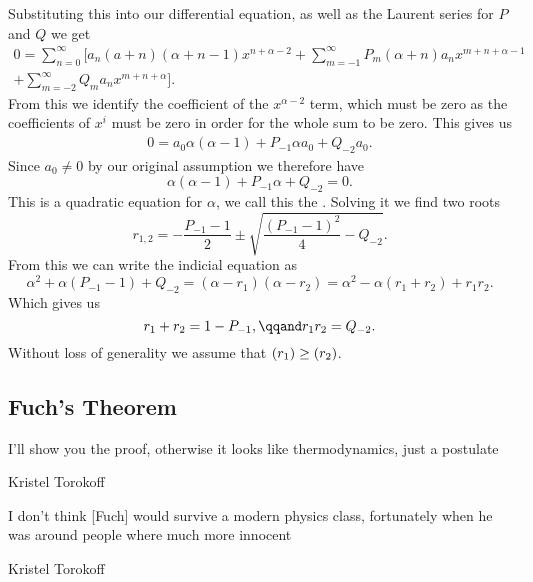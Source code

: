\documentclass[fleqn]{NotesClass}
\let\Re\relax
\DeclareMathOperator{\Re}{Re}
\begin{document}
    Substituting this into our differential equation, as well as the Laurent series for \(P\) and \(Q\) we get
    \begin{multline}\label{eqn:sub in frobenius}
        0 = \sum_{n=0}^{\infty} \bigg[ a_n(a + n)(\alpha + n - 1)x^{n + \alpha - 2} + \sum_{m=-1}^{\infty} P_m(\alpha + n)a_nx^{m + n + \alpha - 1}\\
        + \sum_{m=-2}^{\infty} Q_ma_n x^{m + n + \alpha} \bigg].
    \end{multline}
    From this we identify the coefficient of the \(x^{\alpha - 2}\) term, which must be zero as the coefficients of \(x^i\) must be zero in order for the whole sum to be zero.
    This gives us
    \begin{align}
        0 = a_0\alpha(\alpha - 1) + P_{-1}\alpha a_0 + Q_{-2}a_0.
    \end{align}
    Since \(a_0 \ne 0\) by our original assumption we therefore have
    \begin{equation}
        \alpha(\alpha - 1) + P_{-1}\alpha + Q_{-2} = 0.
    \end{equation}
    This is a quadratic equation for \(\alpha\), we call this the .
    Solving it we find two roots
    \begin{equation}
        r_{1,2} = -\frac{P_{-1} - 1}{2} \pm \sqrt{\frac{(P_{-1} - 1)^2}{4} - Q_{-2}}.
    \end{equation}
    From this we can write the indicial equation as
    \begin{equation}
        \alpha^2 + \alpha(P_{-1} - 1) + Q_{-2} = (\alpha - r_1)(\alpha - r_2) = \alpha^2 - \alpha(r_1+r_2) + r_1r_2.
    \end{equation}
    Which gives us
    \begin{equation}
        r_1 + r_2 = 1 - P_{-1}, \qqand r_1 r_2 = Q_{-2}.
    \end{equation}
    Without loss of generality we assume that \(\Re(r_1) \ge \Re(r_2)\).
    
    \subsection{Fuch's Theorem}
    \epigraph{I'll show you the proof, otherwise it looks like thermodynamics, just a postulate}{Kristel Torokoff}
    \epigraph{I don't think [Fuch] would survive a modern physics class, fortunately when he was around people where much more innocent}{Kristel Torokoff}
    
\end{document}
